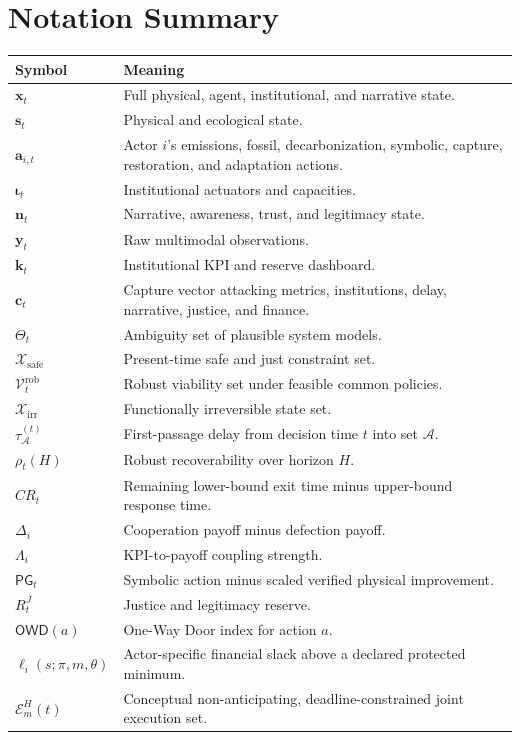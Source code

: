 \documentclass[11pt,a4paper]{article}
\numberwithin{equation}{section}
\theoremstyle{definition}
\theoremstyle{plain}
\theoremstyle{remark}
\newcommand{\safe}{\mathcal{X}_{\mathrm{safe}}}
\newcommand{\irrev}{\mathcal{X}_{\mathrm{irr}}}
\newcommand{\state}{\bm{x}}
\newcommand{\kpi}{\bm{k}}
\newcommand{\action}{\bm{a}}
\newcommand{\capture}{\bm{c}}
\newcommand{\inst}{\bm{\iota}}
\newcommand{\narr}{\bm{n}}
\begin{document}
\section{Notation Summary}

\begin{longtable}{@{}L{0.20\textwidth}L{0.72\textwidth}@{}}
\toprule
\textbf{Symbol} & \textbf{Meaning} \\
\midrule
$\state_t$ & Full physical, agent, institutional, and narrative state. \\
$\bm{s}_t$ & Physical and ecological state. \\
$\action_{i,t}$ & Actor $i$'s emissions, fossil, decarbonization, symbolic, capture, restoration, and adaptation actions. \\
$\inst_t$ & Institutional actuators and capacities. \\
$\narr_t$ & Narrative, awareness, trust, and legitimacy state. \\
$\bm y_t$ & Raw multimodal observations. \\
$\kpi_t$ & Institutional KPI and reserve dashboard. \\
$\capture_t$ & Capture vector attacking metrics, institutions, delay, narrative, justice, and finance. \\
$\Theta_t$ & Ambiguity set of plausible system models. \\
$\safe$ & Present-time safe and just constraint set. \\
$\mathcal V_t^{\mathrm{rob}}$ & Robust viability set under feasible common policies. \\
$\irrev$ & Functionally irreversible state set. \\
$\tau_{\mathcal A}^{(t)}$ & First-passage delay from decision time $t$ into set $\mathcal A$. \\
$\rho_t(H)$ & Robust recoverability over horizon $H$. \\
$CR_t$ & Remaining lower-bound exit time minus upper-bound response time. \\
$\Delta_i$ & Cooperation payoff minus defection payoff. \\
$\Lambda_i$ & KPI-to-payoff coupling strength. \\
$\mathsf{PG}_t$ & Symbolic action minus scaled verified physical improvement. \\
$R_t^J$ & Justice and legitimacy reserve. \\
$\mathsf{OWD}(a)$ & One-Way Door index for action $a$. \\
$\ell_i(s;\pi,m,\theta)$ & Actor-specific financial slack above a declared protected minimum. \\
$\mathcal E_m^H(t)$ & Conceptual non-anticipating, deadline-constrained joint execution set. \\
\bottomrule
\end{longtable}
\end{document}
